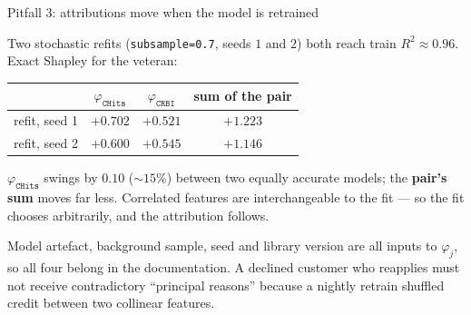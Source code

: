 \documentclass[aspectratio=169,11pt]{beamer}
\begin{document}
\begin{frame}{Pitfall 3: attributions move when the model is retrained}
  \footnotesize
  \begin{numexample}
    Two stochastic refits (\texttt{subsample=0.7}, seeds $1$ and $2$) both reach
    train $R^2 \approx 0.96$. Exact Shapley for the veteran:
    \begin{center}
    \begin{tabular}{@{}lccc@{}}
      \toprule
      & $\varphi_{\texttt{CHits}}$ & $\varphi_{\texttt{CRBI}}$ & sum of the pair \\
      \midrule
      refit, seed 1 & $+0.702$ & $+0.521$ & $+1.223$ \\
      refit, seed 2 & $+0.600$ & $+0.545$ & $+1.146$ \\
      \bottomrule
    \end{tabular}
    \end{center}
    $\varphi_{\texttt{CHits}}$ swings by $0.10$ ($\sim15\%$) between two equally
    accurate models; the \textbf{pair's sum} moves far less. Correlated features are
    interchangeable to the fit --- so the fit chooses arbitrarily, and the
    attribution follows.
  \end{numexample}
  \begin{takeaway}
    Model artefact, background sample, seed and library version are all inputs to
    $\varphi_j$, so all four belong in the documentation. A declined customer who
    reapplies must not receive contradictory ``principal reasons'' because a nightly
    retrain shuffled credit between two collinear features.
  \end{takeaway}
\end{frame}
\end{document}
